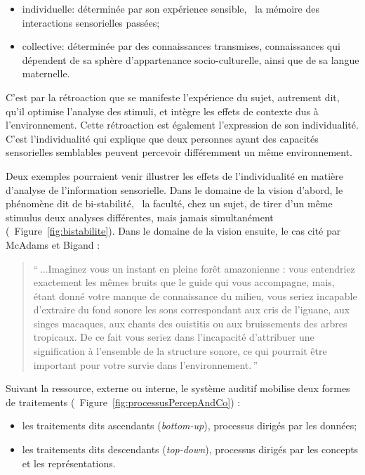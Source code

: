 \begin{itemize}
\item individuelle: déterminée par son expérience sensible, \ie~la mémoire des interactions sensorielles passées;
\item collective: déterminée par des connaissances transmises, connaissances qui dépendent de sa sphère d'appartenance socio-culturelle, ainsi que de sa langue maternelle.
\end{itemize}

C'est par la rétroaction que se manifeste l'expérience du sujet, autrement dit, qu'il optimise l'analyse des stimuli, et intègre les effets de contexte dus à l'environnement. Cette rétroaction est également l'expression de son individualité. C'est l'individualité qui explique que deux personnes ayant des capacités sensorielles semblables peuvent percevoir différemment un même environnement. 

Deux exemples pourraient venir illustrer les effets de l'individualité en matière d'analyse de l'information sensorielle. Dans le domaine de la vision d'abord, le phénomène dit de bi-stabilité, \ie~la faculté, chez un sujet, de tirer d'un même stimulus deux analyses différentes, mais jamais simultanément \citep{schwartz2012multistability} (\cf~Figure~\ref{fig:bistabilite}). Dans le domaine de la vision ensuite, le cas cité par McAdams et Bigand \citep[p. 2]{mcadams1994penser}:

\begin{quote}
``\,...Imaginez vous un instant en pleine forêt amazonienne : vous entendriez exactement les mêmes bruits que le guide qui vous accompagne, mais, étant donné votre manque de connaissance du milieu, vous seriez incapable d'extraire du fond sonore les sons correspondant aux cris de l'iguane, aux singes macaques, aux chants des ouistitis ou aux bruissements des arbres tropicaux. De ce fait vous seriez dans l'incapacité d'attribuer une signification à l'ensemble de la structure sonore, ce qui pourrait être important pour votre survie dans l'environnement.\,''
\end{quote}


Suivant la ressource, externe ou interne, le système auditif mobilise deux formes de traitements (\cf~Figure~\ref{fig:processusPercepAndCo}) :

\begin{itemize}
\item les traitements dits ascendants (\emph{bottom-up}), processus dirigés par les données;
\item les traitements dits descendants (\emph{top-down}), processus dirigés par les concepts et les représentations.
\end{itemize}


